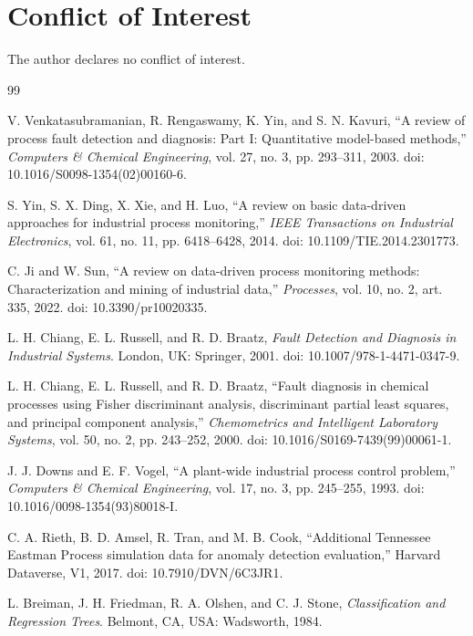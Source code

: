 \documentclass[10pt,twocolumn,a4paper]{article}
\begin{document}
\section*{Conflict of Interest}

The author declares no conflict of interest.

\balance
\begin{thebibliography}{99}

V. Venkatasubramanian, R. Rengaswamy, K. Yin, and S. N. Kavuri,
``A review of process fault detection and diagnosis: Part I: Quantitative
model-based methods,'' \emph{Computers \& Chemical Engineering}, vol. 27,
no. 3, pp. 293--311, 2003. doi: 10.1016/S0098-1354(02)00160-6.

S. Yin, S. X. Ding, X. Xie, and H. Luo,
``A review on basic data-driven approaches for industrial process monitoring,''
\emph{IEEE Transactions on Industrial Electronics}, vol. 61, no. 11,
pp. 6418--6428, 2014. doi: 10.1109/TIE.2014.2301773.

C. Ji and W. Sun,
``A review on data-driven process monitoring methods: Characterization and
mining of industrial data,'' \emph{Processes}, vol. 10, no. 2, art. 335,
2022. doi: 10.3390/pr10020335.

L. H. Chiang, E. L. Russell, and R. D. Braatz,
\emph{Fault Detection and Diagnosis in Industrial Systems}. London, UK:
Springer, 2001. doi: 10.1007/978-1-4471-0347-9.

L. H. Chiang, E. L. Russell, and R. D. Braatz,
``Fault diagnosis in chemical processes using Fisher discriminant analysis,
discriminant partial least squares, and principal component analysis,''
\emph{Chemometrics and Intelligent Laboratory Systems}, vol. 50, no. 2,
pp. 243--252, 2000. doi: 10.1016/S0169-7439(99)00061-1.

J. J. Downs and E. F. Vogel,
``A plant-wide industrial process control problem,''
\emph{Computers \& Chemical Engineering}, vol. 17, no. 3, pp. 245--255,
1993. doi: 10.1016/0098-1354(93)80018-I.

C. A. Rieth, B. D. Amsel, R. Tran, and M. B. Cook,
``Additional Tennessee Eastman Process simulation data for anomaly detection
evaluation,'' Harvard Dataverse, V1, 2017.
doi: 10.7910/DVN/6C3JR1.

L. Breiman, J. H. Friedman, R. A. Olshen, and C. J. Stone,
\emph{Classification and Regression Trees}. Belmont, CA, USA: Wadsworth, 1984.


\end{thebibliography}
\end{document}
